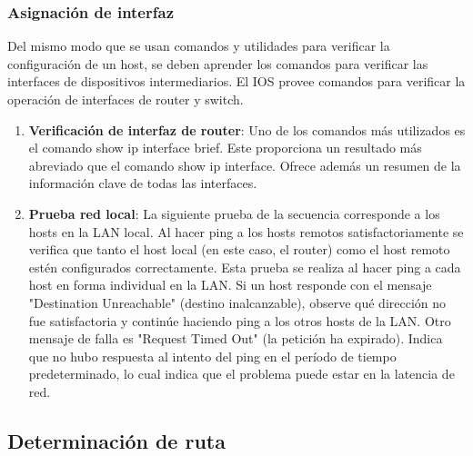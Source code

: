\documentclass[
	12pt, %
	fleqn, %
	a4paper, %
	oneside, %
]{LegrandOrangeBook}
\begin{document}
\subsubsection{Asignación de interfaz}
Del mismo modo que se usan comandos y utilidades para verificar la configuración de un host, se deben aprender los comandos para verificar las interfaces de dispositivos intermediarios. El IOS provee comandos para verificar la operación de interfaces de router y switch.
\begin{enumerate}
\item \textbf{Verificación de interfaz de router}: Uno de los comandos más utilizados es el comando show ip interface brief. Este proporciona un resultado más abreviado que el comando show ip interface. Ofrece además un resumen de la información clave de todas las interfaces.
\item \textbf{Prueba red local}: La siguiente prueba de la secuencia corresponde a los hosts en la LAN local. Al hacer ping a los hosts remotos satisfactoriamente se verifica que tanto el host local (en este caso, el router) como el host remoto estén configurados correctamente. Esta prueba se realiza al hacer ping a cada host en forma individual en la LAN. Si un host responde con el mensaje "Destination Unreachable" (destino inalcanzable), observe qué dirección no fue satisfactoria y continúe haciendo ping a los otros hosts de la LAN. Otro mensaje de falla es "Request Timed Out" (la petición ha expirado). Indica que no hubo respuesta al intento del ping en el período de tiempo predeterminado, lo cual indica que el problema puede estar en la latencia de red.
\end{enumerate}
\subsection{Determinación de ruta}
\end{document}
